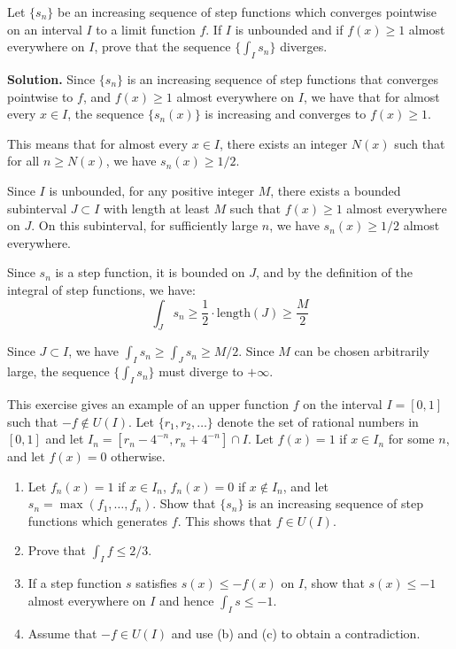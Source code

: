 \begin{problembox}
Let $\{s_n\}$ be an increasing sequence of step functions which converges pointwise on an interval $I$ to a limit function $f$. If $I$ is unbounded and if $f(x) \geq 1$ almost everywhere on $I$, prove that the sequence $\{\int_I s_n\}$ diverges.
\end{problembox}

\noindent\textbf{Solution.}
Since $\{s_n\}$ is an increasing sequence of step functions that converges pointwise to $f$, and $f(x) \geq 1$ almost everywhere on $I$, we have that for almost every $x \in I$, the sequence $\{s_n(x)\}$ is increasing and converges to $f(x) \geq 1$.

This means that for almost every $x \in I$, there exists an integer $N(x)$ such that for all $n \geq N(x)$, we have $s_n(x) \geq 1/2$.

Since $I$ is unbounded, for any positive integer $M$, there exists a bounded subinterval $J \subset I$ with length at least $M$ such that $f(x) \geq 1$ almost everywhere on $J$. On this subinterval, for sufficiently large $n$, we have $s_n(x) \geq 1/2$ almost everywhere.

Since $s_n$ is a step function, it is bounded on $J$, and by the definition of the integral of step functions, we have:
\[\int_J s_n \geq \frac{1}{2} \cdot \text{length}(J) \geq \frac{M}{2}\]

Since $J \subset I$, we have $\int_I s_n \geq \int_J s_n \geq M/2$. Since $M$ can be chosen arbitrarily large, the sequence $\{\int_I s_n\}$ must diverge to $+\infty$.

\begin{problembox}
This exercise gives an example of an upper function $f$ on the interval $I = [0, 1]$ such that $-f \notin U(I)$. Let $\{r_1, r_2, \ldots\}$ denote the set of rational numbers in $[0, 1]$ and let $I_n = [r_n - 4^{-n}, r_n + 4^{-n}] \cap I$. Let $f(x) = 1$ if $x \in I_n$ for some $n$, and let $f(x) = 0$ otherwise.
\begin{enumerate}[label=(\alph*)]
    \item Let $f_n(x) = 1$ if $x \in I_n$, $f_n(x) = 0$ if $x \notin I_n$, and let $s_n = \max(f_1, \ldots, f_n)$. Show that $\{s_n\}$ is an increasing sequence of step functions which generates $f$. This shows that $f \in U(I)$.
    \item Prove that $\int_I f \leq 2/3$.
    \item If a step function $s$ satisfies $s(x) \leq -f(x)$ on $I$, show that $s(x) \leq -1$ almost everywhere on $I$ and hence $\int_I s \leq -1$.
    \item Assume that $-f \in U(I)$ and use (b) and (c) to obtain a contradiction.
\end{enumerate}
\end{problembox}

